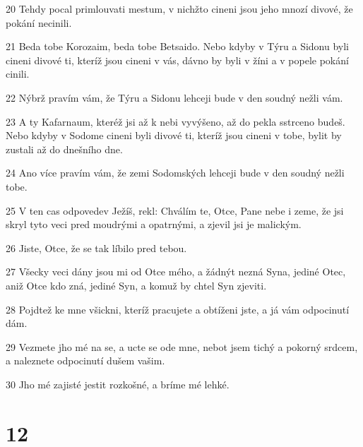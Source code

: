 \par 20 Tehdy pocal primlouvati mestum, v nichžto cineni jsou jeho mnozí divové, že pokání necinili.
\par 21 Beda tobe Korozaim, beda tobe Betsaido. Nebo kdyby v Týru a Sidonu byli cineni divové ti, kteríž jsou cineni v vás, dávno by byli v žíni a v popele pokání cinili.
\par 22 Nýbrž pravím vám, že Týru a Sidonu lehceji bude v den soudný nežli vám.
\par 23 A ty Kafarnaum, kteréž jsi až k nebi vyvýšeno, až do pekla sstrceno budeš. Nebo kdyby v Sodome cineni byli divové ti, kteríž jsou cineni v tobe, bylit by zustali až do dnešního dne.
\par 24 Ano více pravím vám, že zemi Sodomských lehceji bude v den soudný nežli tobe.
\par 25 V ten cas odpovedev Ježíš, rekl: Chválím te, Otce, Pane nebe i zeme, že jsi skryl tyto veci pred moudrými a opatrnými, a zjevil jsi je malickým.
\par 26 Jiste, Otce, že se tak líbilo pred tebou.
\par 27 Všecky veci dány jsou mi od Otce mého, a žádnýt nezná Syna, jediné Otec, aniž Otce kdo zná, jediné Syn, a komuž by chtel Syn zjeviti.
\par 28 Pojdtež ke mne všickni, kteríž pracujete a obtíženi jste, a já vám odpocinutí dám.
\par 29 Vezmete jho mé na se, a ucte se ode mne, nebot jsem tichý a pokorný srdcem, a naleznete odpocinutí dušem vašim.
\par 30 Jho mé zajisté jestit rozkošné, a bríme mé lehké.

\chapter{12}

